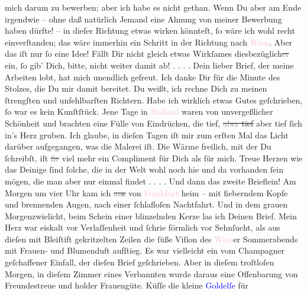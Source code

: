 \documentclass[twoside=false,titlepage=false,open=any, parskip=never, fontsize=12pt, headings=small, chapterprefix=false, appendixprefix=false]{scrbook}
\newcommand{\strikeout}[1]{\sout{#1}}
\newcommand{\dotsfour}{%
.\kern\ellipsisgap 
.\kern\ellipsisgap
.\kern\ellipsisgap
.\kern\ellipsisgap 
\relax}
\newcommand{\pbposition}{\depth}
\newcommand{\pb}{\nobreak\hspace{0pt}\raisebox{-0.1em}{\raisebox{\pbposition}{\textnormal{|}}}\nobreak\hspace{0pt}}
\begin{document}
               mich darum zu bewerben; aber ich habe es nicht gethan. Wenn Du aber am Ende irgendwie
               – ohne daß natürlich Jemand eine Ahnung von meiner Bewerbung haben dürfte! – in
               dieſer Richtung etwas wirken könnteſt, ſo wäre ich wohl recht einverſtanden; das wäre
               immerhin ein Schritt in der Richtung nach \textcolor{pink}{Wien}{}\ledrightnote{\textcolor{pink}{Wien}}.
               Aber das iſt nur ſo eine Idee! Fällt Dir nicht gleich etwas Wirkſames
                  diesbezüglich\strikeout{\textcolor{gray}{er}} ein, ſo gib’ Dich, bitte, nicht weiter damit ab! {\dotsfour}
               Dein lieber Brief, der meine Arbeiten lobt, hat mich unendlich gefreut. Ich danke Dir
               für die Minute des Stolzes, die Du mir damit bereitet. Du weißt, ich rechne Dich zu
               meinen ſtrengſten und unfehlbarſten Richtern. Habe ich wirklich etwas Gutes
               geſchrieben, ſo war es kein Kunſtſtück. Jene Tage in \textcolor{pink}{Holland}{}\ledrightnote{\textcolor{pink}{Niederlande}} waren von unvergeßlicher Schönheit und brachten eine Fülle von
               Eindrücken, die tief, \strikeout{\textcolor{gray}{aber} tief} aber tief ſich in’s Herz gruben. Ich glaube, in
               dieſen Tagen iſt mir zum erſten Mal das Licht darüber aufgegangen, was die Malerei
               iſt. Die Wärme freilich, mit der Du ſchreibſt, iſt \strikeout{\textcolor{gray}{fie}} viel mehr {\pb}ein Compliment für Dich als für
               mich. Treue Herzen wie das Deinige ſind ſolche, die in der Welt wohl noch hie und da
               vorhanden ſein mögen, die man aber nur einmal findet{\dotsfour} Und
               dann das zweite Brieflein! Am Morgen um vier Uhr kam ich \strikeout{\textcolor{gray}{au}s} von \textcolor{pink}{Frankfurt}{}\ledrightnote{\textcolor{pink}{Frankfurt am Main}}
               heim – mit fieberndem Kopfe und brennenden Augen, nach einer ſchlafloſen Nachtfahrt.
               Und in dem grauen Morgenzwielicht, beim Schein einer blinzelnden Kerze las ich Deinen
               Brief. Mein Herz war eiskalt vor Verlaſſenheit und ſchrie förmlich vor Sehnſucht, als
               aus dieſen mit Bleiſtift gekritzelten Zeilen die ſüße Viſion des \textcolor{pink}{Wien}{}\ledrightnote{\textcolor{pink}{Wien}}er Sommerabends mit Frauen- und Blumenduft aufſtieg. Es war
               vielleicht ein vom Champagner geſchaffener Einfall, der dieſen Brief geſchrieben.
               Aber in dieſem troſtloſen Morgen, in dieſem Zimmer eines Verbannten wurde daraus eine
               Offenbarung von Freundestreue und holder Frauengüte. Küſſe die kleine \textcolor{blue}{Goldelſe}{} für
\end{document}
